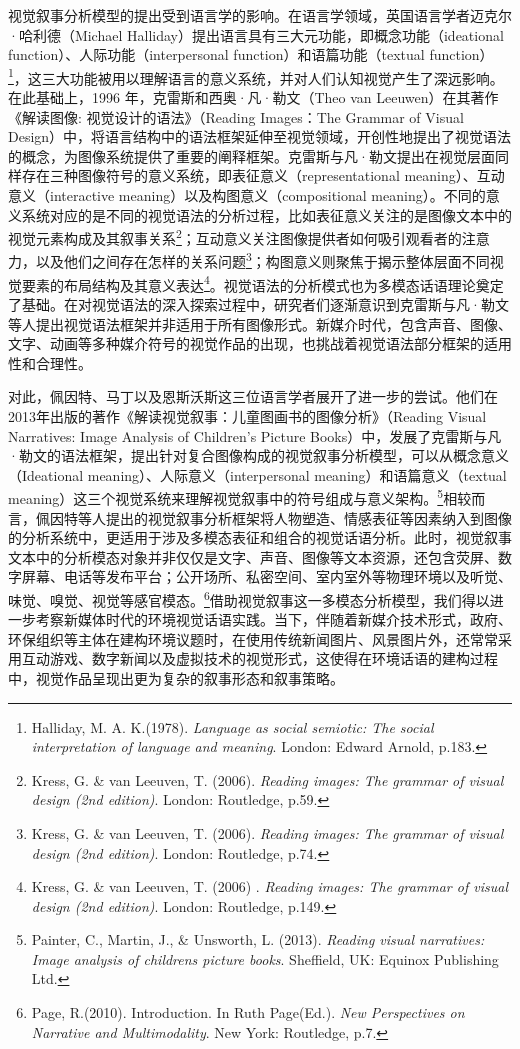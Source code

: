 视觉叙事分析模型的提出受到语言学的影响。在语言学领域，英国语言学者迈克尔·哈利德（Michael
Halliday）提出语言具有三大元功能，即概念功能（ideational
function）、人际功能（interpersonal function）和语篇功能（textual
function）\footnote{Halliday, M. A. K.(1978). \emph{Language as social
  semiotic: The social interpretation of language and meaning}. London:
  Edward Arnold, p.183.}，这三大功能被用以理解语言的意义系统，并对人们认知视觉产生了深远影响。在此基础上，1996
年，克雷斯和西奥·凡·勒文（Theo van Leeuwen）在其著作《解读图像:
视觉设计的语法》（Reading Images：The Grammar of Visual
Design）中，将语言结构中的语法框架延伸至视觉领域，开创性地提出了视觉语法的概念，为图像系统提供了重要的阐释框架。克雷斯与凡·勒文提出在视觉层面同样存在三种图像符号的意义系统，即表征意义（representational
meaning）、互动意义（interactive meaning）以及构图意义（compositional
meaning）。不同的意义系统对应的是不同的视觉语法的分析过程，比如表征意义关注的是图像文本中的视觉元素构成及其叙事关系\footnote{Kress,
  G. \& van Leeuven, T. (2006). \emph{Reading images: The grammar of
  visual design (2nd edition)}. London: Routledge, p.59.}；互动意义关注图像提供者如何吸引观看者的注意力，以及他们之间存在怎样的关系问题\footnote{Kress,
  G. \& van Leeuven, T. (2006). \emph{Reading images: The grammar of
  visual design (2nd edition)}. London: Routledge, p.74.}；构图意义则聚焦于揭示整体层面不同视觉要素的布局结构及其意义表达\footnote{Kress,
  G. \& van Leeuven, T. (2006) . \emph{Reading images: The grammar of
  visual design (2nd edition)}. London: Routledge, p.149.}。视觉语法的分析模式也为多模态话语理论奠定了基础。在对视觉语法的深入探索过程中，研究者们逐渐意识到克雷斯与凡·勒文等人提出视觉语法框架并非适用于所有图像形式。新媒介时代，包含声音、图像、文字、动画等多种媒介符号的视觉作品的出现，也挑战着视觉语法部分框架的适用性和合理性。

对此，佩因特、马丁以及恩斯沃斯这三位语言学者展开了进一步的尝试。他们在2013年出版的著作《解读视觉叙事：儿童图画书的图像分析》（Reading
Visual Narratives: Image Analysis of Children's Picture
Books）中，发展了克雷斯与凡·勒文的语法框架，提出针对复合图像构成的视觉叙事分析模型，可以从概念意义（Ideational
meaning）、人际意义（interpersonal meaning）和语篇意义（textual
meaning）这三个视觉系统来理解视觉叙事中的符号组成与意义架构。\footnote{Painter,
  C., Martin, J., \& Unsworth, L. (2013). \emph{Reading visual
  narratives: Image analysis of children\textquotesingle s picture
  books}. Sheffield, UK: Equinox Publishing Ltd.}相较而言，佩因特等人提出的视觉叙事分析框架将人物塑造、情感表征等因素纳入到图像的分析系统中，更适用于涉及多模态表征和组合的视觉话语分析。此时，视觉叙事文本中的分析模态对象并非仅仅是文字、声音、图像等文本资源，还包含荧屏、数字屏幕、电话等发布平台；公开场所、私密空间、室内室外等物理环境以及听觉、味觉、嗅觉、视觉等感官模态。\footnote{Page,
  R.(2010). Introduction. In Ruth Page(Ed.). \emph{New Perspectives on
  Narrative and Multimodality}. New York: Routledge, p.7.}借助视觉叙事这一多模态分析模型，我们得以进一步考察新媒体时代的环境视觉话语实践。当下，伴随着新媒介技术形式，政府、环保组织等主体在建构环境议题时，在使用传统新闻图片、风景图片外，还常常采用互动游戏、数字新闻以及虚拟技术的视觉形式，这使得在环境话语的建构过程中，视觉作品呈现出更为复杂的叙事形态和叙事策略。

